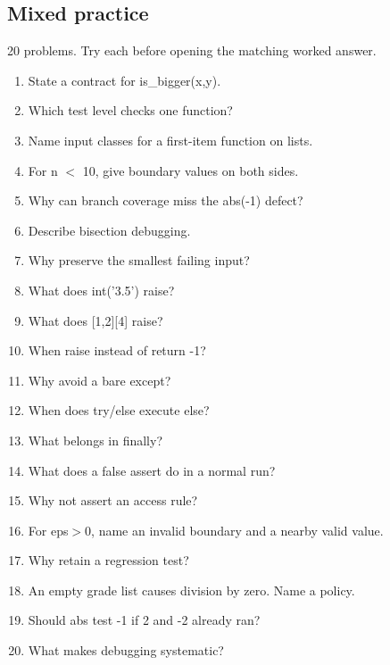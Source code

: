 \documentclass[11pt]{article}
\begin{document}
\clearpage

\begin{keepsection}
\section{Mixed practice}

20 problems. Try each before opening the matching worked answer.

\begin{enumerate}
\item State a contract for is\_bigger(x,y).
\item Which test level checks one function?
\item Name input classes for a first-item function on lists.
\item For n \ensuremath{<} 10, give boundary values on both sides.
\item Why can branch coverage miss the abs(-1) defect?
\item Describe bisection debugging.
\item Why preserve the smallest failing input?
\item What does int('3.5') raise?
\item What does [1,2][4] raise?
\item When raise instead of return -1?
\item Why avoid a bare except?
\item When does try/else execute else?
\item What belongs in finally?
\item What does a false assert do in a normal run?
\item Why not assert an access rule?
\item For eps\ensuremath{>}0, name an invalid boundary and a nearby valid value.
\item Why retain a regression test?
\item An empty grade list causes division by zero. Name a policy.
\item Should abs test -1 if 2 and -2 already ran?
\item What makes debugging systematic?
\end{enumerate}

\end{keepsection}
\end{document}

